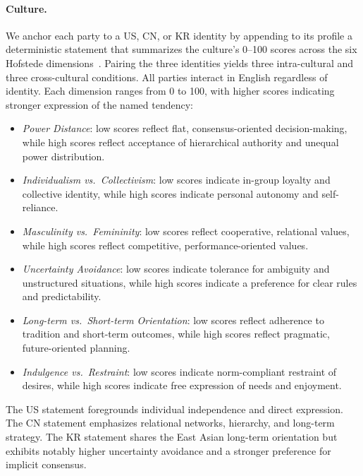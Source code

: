\paragraph{Culture.}
We anchor each party to a US, CN, or KR identity by appending to its profile a deterministic statement that summarizes the culture's 0--100 scores across the six Hofstede dimensions~\citep{hofstede2010cultures}. Pairing the three identities yields three intra-cultural and three cross-cultural conditions. All parties interact in English regardless of identity.
%
Each dimension ranges from 0 to 100, with higher scores indicating stronger expression of the named tendency:
\begin{itemize}[leftmargin=*, noitemsep, topsep=2pt]
    \item \emph{Power Distance}: low scores reflect flat, consensus-oriented decision-making, while high scores reflect acceptance of hierarchical authority and unequal power distribution.
    \item \emph{Individualism vs.\ Collectivism}: low scores indicate in-group loyalty and collective identity, while high scores indicate personal autonomy and self-reliance.
    \item \emph{Masculinity vs.\ Femininity}: low scores reflect cooperative, relational values, while high scores reflect competitive, performance-oriented values.
    \item \emph{Uncertainty Avoidance}: low scores indicate tolerance for ambiguity and unstructured situations, while high scores indicate a preference for clear rules and predictability.
    \item \emph{Long-term vs.\ Short-term Orientation}: low scores reflect adherence to tradition and short-term outcomes, while high scores reflect pragmatic, future-oriented planning.
    \item \emph{Indulgence vs.\ Restraint}: low scores indicate norm-compliant restraint of desires, while high scores indicate free expression of needs and enjoyment.
\end{itemize}
%
The US statement foregrounds individual independence and direct expression. The CN statement emphasizes relational networks, hierarchy, and long-term strategy. The KR statement shares the East Asian long-term orientation but exhibits notably higher uncertainty avoidance and a stronger preference for implicit consensus.



